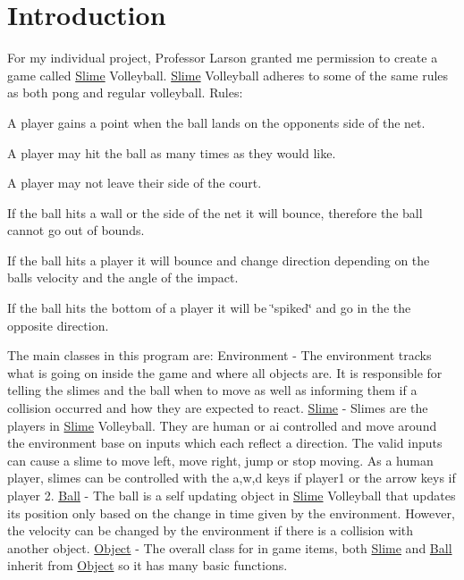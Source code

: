 \hypertarget{index_intro_sec}{}\section{Introduction}\label{index_intro_sec}
For my individual project, Professor Larson granted me permission to create a game called \hyperlink{classSlime}{Slime} Volleyball. \hyperlink{classSlime}{Slime} Volleyball adheres to some of the same rules as both pong and regular volleyball. Rules\-:
\begin{DoxyEnumerate}
\item A player gains a point when the ball lands on the opponents side of the net.
\item A player may hit the ball as many times as they would like.
\item A player may not leave their side of the court.
\item If the ball hits a wall or the side of the net it will bounce, therefore the ball cannot go out of bounds.
\item If the ball hits a player it will bounce and change direction depending on the balls velocity and the angle of the impact.
\item If the ball hits the bottom of a player it will be \char`\"{}spiked\char`\"{} and go in the the opposite direction.
\end{DoxyEnumerate}

The main classes in this program are\-: Environment -\/ The environment tracks what is going on inside the game and where all objects are. It is responsible for telling the slimes and the ball when to move as well as informing them if a collision occurred and how they are expected to react. \hyperlink{classSlime}{Slime} -\/ Slimes are the players in \hyperlink{classSlime}{Slime} Volleyball. They are human or ai controlled and move around the environment base on inputs which each reflect a direction. The valid inputs can cause a slime to move left, move right, jump or stop moving. As a human player, slimes can be controlled with the a,w,d keys if player1 or the arrow keys if player 2. \hyperlink{classBall}{Ball} -\/ The ball is a self updating object in \hyperlink{classSlime}{Slime} Volleyball that updates its position only based on the change in time given by the environment. However, the velocity can be changed by the environment if there is a collision with another object. \hyperlink{classObject}{Object} -\/ The overall class for in game items, both \hyperlink{classSlime}{Slime} and \hyperlink{classBall}{Ball} inherit from \hyperlink{classObject}{Object} so it has many basic functions.

